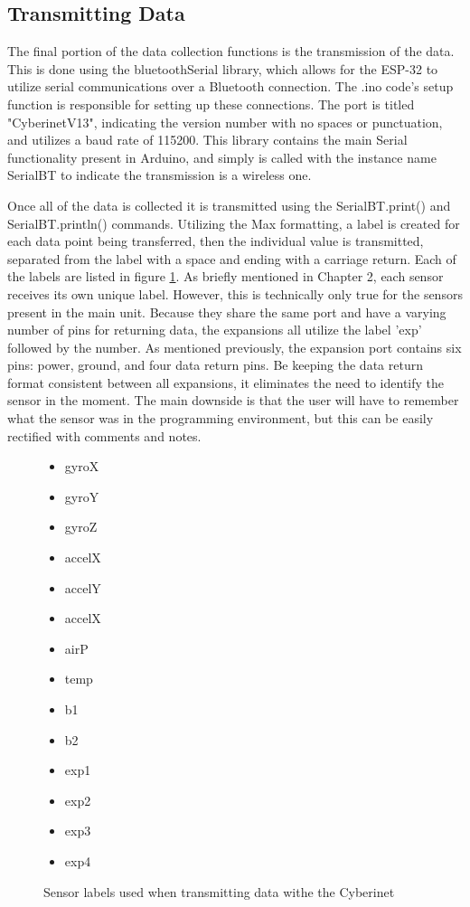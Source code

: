 \subsection{Transmitting Data}
The final portion of the data collection functions is the transmission of the data. This is done using the bluetoothSerial library, which allows for the ESP-32 to utilize serial communications over a Bluetooth connection. The .ino code's setup function is responsible for setting up these connections. The port is titled "CyberinetV13", indicating the version number with no spaces or punctuation, and utilizes a baud rate of 115200. This library contains the main Serial functionality present in Arduino, and simply is called with the instance name SerialBT to indicate the transmission is a wireless one.

Once all of the data is collected it is transmitted using the SerialBT.print() and SerialBT.println() commands. Utilizing the Max formatting, a label is created for each data point being transferred, then the individual value is transmitted, separated from the label with a space and ending with a carriage return. Each of the labels are listed in figure \ref{fig:sensorLAbels}. As briefly mentioned in Chapter 2, each sensor receives its own unique label. However, this is technically only true for the sensors present in the main unit. Because they share the same port and have a varying number of pins for returning data, the expansions all utilize the label 'exp' followed by the number. As mentioned previously, the expansion port contains six pins: power, ground, and four data return pins. Be keeping the data return format consistent between all expansions, it eliminates the need to identify the sensor in the moment. The main downside is that the user will have to remember what the sensor was in the programming environment, but this can be easily rectified with comments and notes.

\begin{figure}
    \centering
    \begin{itemize}
    \item gyroX
    \item gyroY
    \item gyroZ
    \item accelX
    \item accelY
    \item accelX
    \item airP
    \item temp
    \item b1
    \item b2
    \item exp1
    \item exp2
    \item exp3
    \item exp4
\end{itemize}
    \caption{Sensor labels used when transmitting data withe the Cyberinet}
    \label{fig:sensorLAbels}
\end{figure}

